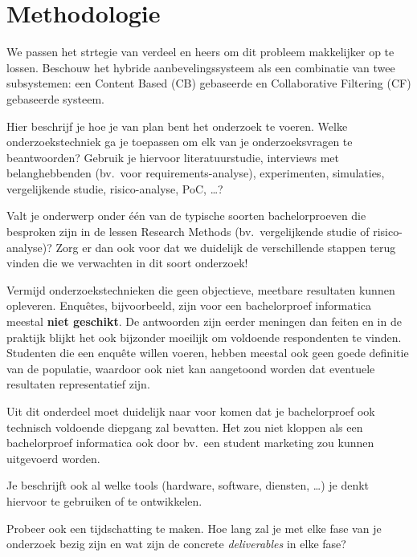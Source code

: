 
\section{Methodologie}%
\label{sec:methodologie}

We passen het strtegie van verdeel en heers om dit probleem makkelijker op te lossen. Beschouw het hybride aanbevelingssysteem als een combinatie van twee subsystemen: een Content Based (CB) gebaseerde en Collaborative Filtering (CF) gebaseerde systeem. 

Hier beschrijf je hoe je van plan bent het onderzoek te voeren. Welke onderzoekstechniek ga je toepassen om elk van je onderzoeksvragen te beantwoorden? Gebruik je hiervoor literatuurstudie, interviews met belanghebbenden (bv.~voor requirements-analyse), experimenten, simulaties, vergelijkende studie, risico-analyse, PoC, \ldots?

Valt je onderwerp onder één van de typische soorten bachelorproeven die besproken zijn in de lessen Research Methods (bv.\ vergelijkende studie of risico-analyse)? Zorg er dan ook voor dat we duidelijk de verschillende stappen terug vinden die we verwachten in dit soort onderzoek!

Vermijd onderzoekstechnieken die geen objectieve, meetbare resultaten kunnen opleveren. Enquêtes, bijvoorbeeld, zijn voor een bachelorproef informatica meestal \textbf{niet geschikt}. De antwoorden zijn eerder meningen dan feiten en in de praktijk blijkt het ook bijzonder moeilijk om voldoende respondenten te vinden. Studenten die een enquête willen voeren, hebben meestal ook geen goede definitie van de populatie, waardoor ook niet kan aangetoond worden dat eventuele resultaten representatief zijn.

Uit dit onderdeel moet duidelijk naar voor komen dat je bachelorproef ook technisch voldoen\-de diepgang zal bevatten. Het zou niet kloppen als een bachelorproef informatica ook door bv.\ een student marketing zou kunnen uitgevoerd worden.

Je beschrijft ook al welke tools (hardware, software, diensten, \ldots) je denkt hiervoor te gebruiken of te ontwikkelen.

Probeer ook een tijdschatting te maken. Hoe lang zal je met elke fase van je onderzoek bezig zijn en wat zijn de concrete \emph{deliverables} in elke fase?

